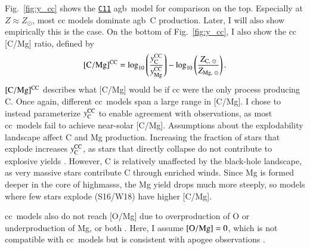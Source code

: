\documentclass[12pt,oneside,letterpaper]{report}
\newcommand{\cc}{\gls{cc}}
\newcommand{\Cc}{\Gls{cc}}
\newcommand{\agb}{\gls{agb}}
\newcommand{\apogee}{\gls{apogee}}
\newcommand{\cxi}{\texttt{\hyperlink{C11}{C11}}}
\newcommand{\Ycc}{\ensuremath{y_{\rm C}^{\rm CC}}}
\newcommand{\Yoc}{\ensuremath{y_{\rm Mg}^{\rm CC}}}
\newcommand{\sun}{\odot}
\begin{document}
Fig.~\ref{fig:y_cc} shows the \cxi{} \agb\ model for comparison on the top. Especially at $Z\approx Z_\odot$, most \cc{} models dominate \agb\ C production. Later, I will also show empirically this is the case.
On the bottom of Fig.~\ref{fig:y_cc}, I also show the \cc{} [C/Mg] ratio, defined by
\begin{equation}\label{eq:c_mg_cc}
    {\rm [C/Mg]^{CC}} = \log_{10}\left( \frac{\Ycc}{\Yoc}\right) - \log_{10} \left( \frac{Z_{{\rm C},\ \sun }}{Z_{{\rm Mg},\ \sun }} \right).
\end{equation}
${\rm [C/Mg]^{CC}}$ describes what [C/Mg] would be if \cc{} were the only process producing C.
Once again, different \cc\ models span a large range in [C/Mg]. 
I chose to instead parameterize $\Ycc$ to enable agreement with observations, as most \cc\ models fail to achieve near-solar [C/Mg].
Assumptions about the explodability landscape affect C and Mg production. Increasing the fraction of stars that explode increases $\Ycc$, as stars that directly collapse do not contribute to explosive yields \citep{emily+21}. However, C is relatively unaffected by the black-hole landscape, as very massive stars contribute C through enriched winds. Since Mg is formed deeper in the core of \glspl{highmass}, the Mg yield drops much more steeply, so models where few stars explode (S16/W18) have higher [C/Mg].

\Cc\ models also do not reach [O/Mg] due to overproduction of O or underproduction of Mg, or both \citep{emily+21}. Here, I assume ${\rm [O/Mg]} = 0$, which is not compatible with \cc\ models but is consistent with \apogee{} observations \citep{weinberg+19, weinberg+22}.
    
\end{document}
